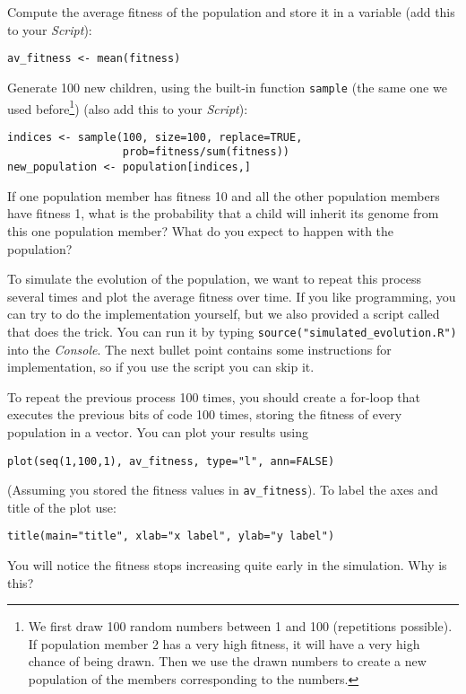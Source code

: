 \documentclass[a4paper, 9pt]{article}
\begin{document}
\begin{exercise}
    \action Compute the average fitness of the population and store it in a variable (add this to your \emph{Script}):
\begin{lstlisting}
av_fitness <- mean(fitness)
\end{lstlisting}
    \action Generate 100 new children, using the built-in function \texttt{sample} (the same one we used before\footnote{We first draw 100 random numbers between 1 and 100 (repetitions possible). If population member 2 has a very high fitness, it will have a very high chance of being drawn. Then we use the drawn numbers to create a new population of the members corresponding to the numbers.}) (also add this to your \emph{Script}):
\begin{lstlisting}[deletekeywords={replace}]
indices <- sample(100, size=100, replace=TRUE, 
                  prob=fitness/sum(fitness))
new_population <- population[indices,]
\end{lstlisting}
    \askstar If one population member has fitness 10 and all the other population members have fitness 1, what is the probability that a child will inherit its genome from this one population member? What do you expect to happen with the population?
\end{exercise}
\begin{exercise}
    \action To simulate the evolution of the population, we want to repeat this process several times and plot the average fitness over time. If you like programming, you can try to do the implementation yourself, but we also provided a script called  that does the trick. You can run it by typing \verb|source("simulated_evolution.R")| into the \emph{Console}. The next bullet point contains some instructions for implementation, so if you use the script you can skip it.

    \action To repeat the previous process 100 times, you should create a for-loop that executes the previous bits of code 100 times, storing the fitness of every population in a vector. You can plot your results using
\begin{lstlisting}
plot(seq(1,100,1), av_fitness, type="l", ann=FALSE)
\end{lstlisting}
    (Assuming you stored the fitness values in \texttt{av\_fitness}).
    To label the axes and title of the plot use:
\begin{lstlisting}
title(main="title", xlab="x label", ylab="y label")
\end{lstlisting}
    \askstar You will notice the fitness stops increasing quite early in the simulation. Why is this?
\end{exercise}
\end{document}
